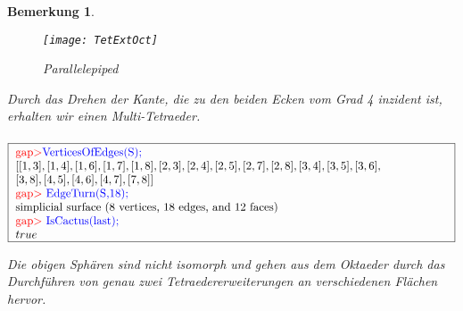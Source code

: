 \documentclass[12pt,titlepage,twoside,cleardoublepage]{article}
\theoremstyle{nummermitklammern}
\newtheorem{bemerkung}[temp]{Bemerkung}
\newtheorem{bemerkung}[zahl]{Bemerkung}
\numberwithin{equation}{section}
\begin{document}
\begin{bemerkung}
\begin{itemize}
\begin{figure}[H]
\begin{center}
\texttt{[image: TetExtOct]}
\end{center}
\caption{Parallelepiped}
\end{figure}
Durch das Drehen der Kante, die zu den beiden Ecken vom Grad 4 inzident ist, erhalten wir einen Multi-Tetraeder.\\\\
$\fbox{
\parbox{13.4cm}{
\textcolor{red}{gap$>$}\textcolor{blue}{ VerticesOfEdges(S);}\newline
$[ [ 1, 3 ], [ 1, 4 ], [ 1, 6 ], [ 1, 7 ], [ 1, 8 ], [ 2, 3 ], [ 2, 4 ], [ 2, 5 ], [ 2, 7 ], [ 2, 8 ], [ 3, 4 ], [ 3, 5 ], [ 3, 6 ], \newline
 [ 3, 8 ],
  [ 4, 5 ], [ 4, 6 ], [ 4, 7 ], [ 7, 8 ] ]$\newline
\textcolor{red}{gap$>$} \textcolor{blue}{EdgeTurn(S,18);}\newline
simplicial surface (8 vertices, 18 edges, and 12 faces)\newline
\textcolor{red}{gap$>$} \textcolor{blue}{IsCactus(last);}\newline
$true$
}}$
\end{itemize}
Die obigen Sphären sind nicht isomorph und gehen aus dem Oktaeder durch das Durchführen von genau zwei Tetraedererweiterungen an verschiedenen Flächen hervor.  
\end{bemerkung}
\end{document}
